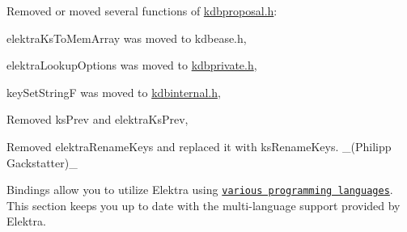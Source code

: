 \begin{DoxyItemize}
\item Removed or moved several functions of {\ttfamily \hyperlink{kdbproposal_8h}{kdbproposal.\+h}}\+:
\begin{DoxyItemize}
\item {\ttfamily elektra\+Ks\+To\+Mem\+Array} was moved to {\ttfamily kdbease.\+h},
\item {\ttfamily elektra\+Lookup\+Options} was moved to {\ttfamily \hyperlink{kdbprivate_8h}{kdbprivate.\+h}},
\item {\ttfamily key\+Set\+StringF} was moved to {\ttfamily \hyperlink{kdbinternal_8h}{kdbinternal.\+h}},
\item Removed {\ttfamily ks\+Prev} and {\ttfamily elektra\+Ks\+Prev},
\item Removed {\ttfamily elektra\+Rename\+Keys} and replaced it with {\ttfamily ks\+Rename\+Keys}. \+\_\+(\+Philipp Gackstatter)\+\_\+
\end{DoxyItemize}
\end{DoxyItemize}

Bindings allow you to utilize Elektra using \href{https://www.libelektra.org/bindings/readme}{\tt various programming languages}. This section keeps you up to date with the multi-\/language support provided by Elektra.


